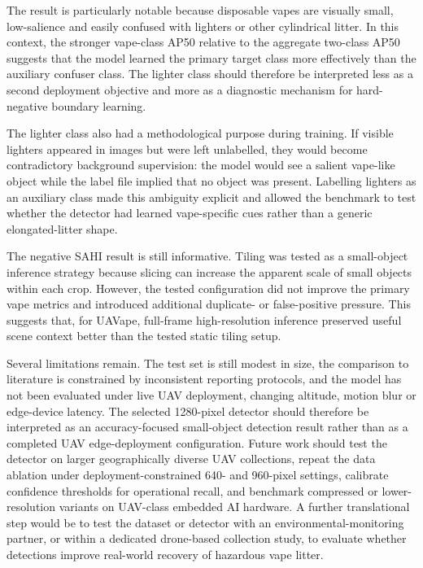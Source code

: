 The result is particularly notable because disposable vapes are visually small, low-salience and easily confused with lighters or other cylindrical litter. In this context, the stronger vape-class AP50 relative to the aggregate two-class AP50 suggests that the model learned the primary target class more effectively than the auxiliary confuser class. The lighter class should therefore be interpreted less as a second deployment objective and more as a diagnostic mechanism for hard-negative boundary learning.

The lighter class also had a methodological purpose during training. If visible lighters appeared in images but were left unlabelled, they would become contradictory background supervision: the model would see a salient vape-like object while the label file implied that no object was present. Labelling lighters as an auxiliary class made this ambiguity explicit and allowed the benchmark to test whether the detector had learned vape-specific cues rather than a generic elongated-litter shape.

The negative SAHI result is still informative. Tiling was tested as a small-object inference strategy because slicing can increase the apparent scale of small objects within each crop. However, the tested configuration did not improve the primary vape metrics and introduced additional duplicate- or false-positive pressure. This suggests that, for UAVape, full-frame high-resolution inference preserved useful scene context better than the tested static tiling setup.

Several limitations remain. The test set is still modest in size, the comparison to literature is constrained by inconsistent reporting protocols, and the model has not been evaluated under live UAV deployment, changing altitude, motion blur or edge-device latency. The selected 1280-pixel detector should therefore be interpreted as an accuracy-focused small-object detection result rather than as a completed UAV edge-deployment configuration. Future work should test the detector on larger geographically diverse UAV collections, repeat the data ablation under deployment-constrained 640- and 960-pixel settings, calibrate confidence thresholds for operational recall, and benchmark compressed or lower-resolution variants on UAV-class embedded AI hardware. A further translational step would be to test the dataset or detector with an environmental-monitoring partner, or within a dedicated drone-based collection study, to evaluate whether detections improve real-world recovery of hazardous vape litter.
